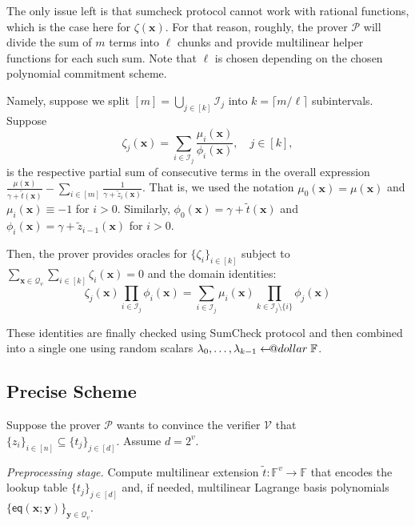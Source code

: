 \documentclass{lookup-template}
\makeatletter
\newcommand\leftarrowS{\leftarrow\joinrel\smalldollar}
\newcommand{\smalldollar}{\mathrel{\mathpalette\small@dollar\relax}}
\newcommand{\small@dollar}[2]{%
  \vcenter{\hbox{%
    $#1\textnormal{\fontsize{0.7\dimexpr\f@size pt}{0}\selectfont\$}$%
  }}%
}
\makeatother
\begin{document}
The only issue left is that sumcheck protocol cannot work with rational
functions, which is the case here for $\zeta(\mathbf{x})$. For that reason,
roughly, the prover $\mathcal{P}$ will divide the sum of $m$ terms into $\ell$
chunks and provide multilinear helper functions for each such sum. Note that 
$\ell$ is chosen depending on the chosen polynomial commitment scheme. 

Namely, suppose we split $[m] = \bigcup_{j \in [k]}\mathcal{I}_j$ into $k=\lceil
m/\ell \rceil$ subintervals. Suppose 
\begin{equation*}
    \zeta_j(\mathbf{x}) = \sum_{i \in \mathcal{I}_j} \frac{\mu_i(\mathbf{x})}{\phi_i(\mathbf{x})}, \quad j \in [k],
\end{equation*}
is the respective partial sum of consecutive terms in the overall expression
$\frac{\mu(\mathbf{x})}{\gamma+\widetilde{t}(\mathbf{x})} - \sum_{i \in
[m]}\frac{1}{\gamma+\widetilde{z}_i(\mathbf{x})}$. That is, we used the notation
$\mu_0(\mathbf{x}) = \mu(\mathbf{x})$ and $\mu_i(\mathbf{x}) \equiv -1$ for
$i>0$. Similarly, $\phi_0(\mathbf{x}) = \gamma+\widetilde{t}(\mathbf{x})$ and
$\phi_i(\mathbf{x}) = \gamma +\widetilde{z}_{i-1}(\mathbf{x})$ for $i>0$.

Then, the prover provides oracles for $\{\zeta_i\}_{i \in [k]}$ subject to
$\sum_{\mathbf{x} \in \mathcal{Q}_v}\sum_{i \in [k]}\zeta_i(\mathbf{x}) = 0$
and the domain identities:
\begin{equation*}
    \zeta_j(\mathbf{x}) \prod_{i \in \mathcal{I}_j} \phi_i(\mathbf{x}) = \sum_{i \in \mathcal{I}_j}\mu_i(\mathbf{x})\prod_{k \in \mathcal{I}_j\setminus \{i\}} \phi_j(\mathbf{x})
\end{equation*}

These identities are finally checked using SumCheck protocol and then combined
into a single one using random scalars $\lambda_0,\dots,\lambda_{k-1}
\leftarrowS \mathbb{F}$.

\subsection*{Precise Scheme}

Suppose the prover $\mathcal{P}$ wants to convince the verifier $\mathcal{V}$
that $\{z_i\}_{i \in [n]} \subseteq \{t_j\}_{j \in [d]}$. Assume $d=2^v$. 

\textit{Preprocessing stage.} Compute multilinear extension $\widetilde{t}:
\mathbb{F}^v \to \mathbb{F}$ that encodes the lookup table $\{t_j\}_{j \in [d]}$
and, if needed, multilinear Lagrange basis polynomials
$\{\mathsf{eq}(\mathbf{x};\mathbf{y})\}_{\mathbf{y} \in \mathcal{Q}_v}$.
\end{document}
